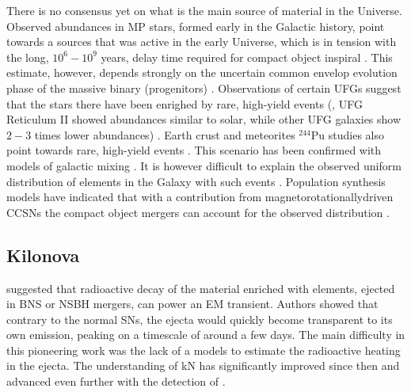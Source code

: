 There is no consensus yet on what is the main source of \rproc{} material in the 
Universe. 
Observed \rproc{} abundances in \ac{MP} stars, formed early in the Galactic history, 
point towards a sources that was active in the early Universe, which is in tension with the long, 
$10^{6} - 10^{9}$ years, delay time required for compact object inspiral 
\citep{DeDonder:2004cx,Dominik:2012kk}. This estimate, however, depends strongly on the 
uncertain common envelop evolution phase of the massive binary (progenitors)
\citep[\eg][]{Dominik:2012kk}.
%
Observations of certain \acp{UFG} suggest that the stars there have been enrighed by rare, 
high-yield events (\eg, \ac{UFG} Reticulum II showed abundances similar to solar, 
while other \ac{UFG} galaxies show $2-3$ times lower abundances) \citep{Ji:2016}.
%
Earth crust and meteorites $^{244}$Pu studies also point towards rare, high-yield 
events \citep{Wallner:2015,Tsujimoto:2017}. This scenario has been confirmed with 
models of galactic mixing \citep{Hotokezaka:2015zea}.
%
It is however difficult to explain the observed uniform distribution of \rproc{} 
elements in the Galaxy with such events \citep{Argast:2003he}.
%
Population synthesis models have indicated that with a contribution from 
magnetorotationallydriven \acp{CCSN} the compact object mergers can account for the 
observed distribution \citep{Ishimaru:2015,Cescutti:2015,Wehmeyer:2015,VanDeVoort:2015}.



\subsection{Kilonova} \label{sec:intro:kilonova}


\citet{Li:1998bw} suggested that 
radioactive decay of the material enriched with \rproc{} elements,
ejected in \ac{BNS} or \ac{NSBH} mergers,
can power an \ac{EM} transient.
%
Authors showed that contrary to the normal \acp{SN}, 
the ejecta would quickly become transparent to its own emission, peaking on a timescale 
of around a few days. 
%
The main difficulty in this pioneering work was the lack of a \nuc{}
models to estimate the radioactive heating in the ejecta. 
%
The understanding of \ac{kN} has significantly improved since then
\citep[\eg][]{Kulkarni:2005jw,Metzger:2010,Roberts:2011,Metzger:2016pju,Wollaeger:2017ahm} 
and advanced even further with the detection of \AT{} \citep[\eg][]{Metzger:2019zeh}.


